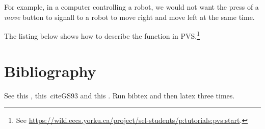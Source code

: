 For example, in a computer controlling a robot, we would not want the press of a \emph{move} button to signall to a robot to move right and move left at the same time.

The listing below shows how to describe the function in PVS.\footnote{%
See \url{https://wiki.eecs.yorku.ca/project/sel-students/p:tutorials:pvs:start}.}

 \section{Bibliography}
 
 See this \cite{Lamsweerde09}, this\ cite{GS93} and this \cite{Spivey92}. Run bibtex and then latex three times. 


